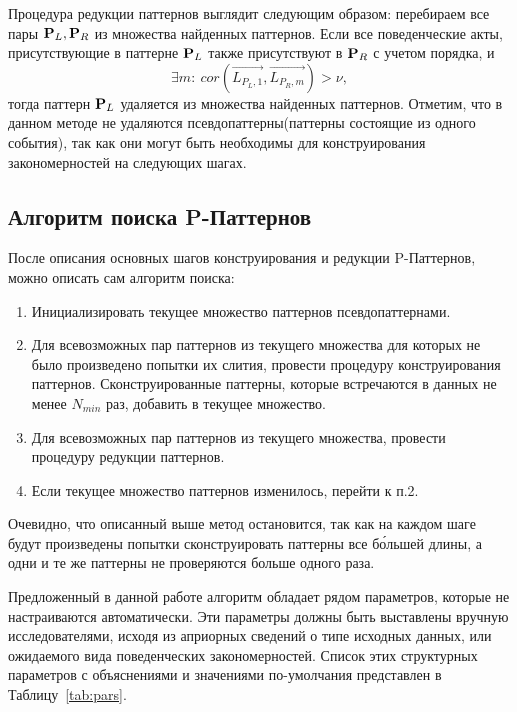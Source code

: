 \documentclass[12pt,fсeqn]{article}
\begin{document}
Процедура редукции паттернов выглядит следующим образом: перебираем все пары ${\bf P}_L, {\bf P}_R$
из множества найденных паттернов. Если все поведенческие акты, присутствующие в паттерне ${\bf P}_L$ 
также присутствуют в ${\bf P}_R$ с учетом порядка, и 
$$
\exists m\colon\: cor\left(\overrightarrow{L_{P_L,1}}, \overrightarrow{L_{P_R,m}} \right) > \nu,
$$
тогда паттерн ${\bf P}_L$ удаляется из множества найденных паттернов. Отметим, что в данном методе
не удаляются псевдопаттерны(паттерны состоящие из одного события), так как они могут быть необходимы для конструирования закономерностей на
следующих шагах.

\subsection{Алгоритм поиска P-Паттернов} 
После описания основных шагов конструирования и редукции P-Паттернов, можно описать сам алгоритм
поиска:
\begin{enumerate}
 \item Инициализировать текущее множество паттернов псевдопаттернами.
 \item Для всевозможных пар паттернов из текущего множества для которых не было произведено попытки их слития, 
провести процедуру конструирования паттернов. Сконструированные паттерны, которые встречаются в данных не менее 
$N_{min}$ раз, добавить в текущее множество.
 \item Для всевозможных пар паттернов из текущего множества, провести процедуру редукции паттернов.
 \item Если текущее множество паттернов изменилось, перейти к п.2.
\end{enumerate}

Очевидно, что описанный выше метод остановится, так как на каждом шаге будут
произведены попытки сконструировать паттерны все б\'{о}льшей длины, а одни и те же паттерны
не проверяются больше одного раза.

Предложенный в данной работе алгоритм обладает рядом параметров, которые не настраиваются 
автоматически. Эти параметры должны быть выставлены вручную исследователями, исходя из
априорных сведений о типе исходных данных, или ожидаемого вида поведенческих закономерностей. 
Список этих структурных параметров с объяснениями и значениями по-умолчания представлен в 
Таблицу~\ref{tab:pars}.
\end{document}

